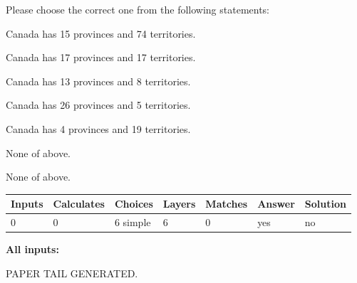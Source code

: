 \documentclass[12pt]{article}
\begin{document}
  
Please choose the correct one from the following statements:
 
 
Canada has  15 provinces and  74 territories.
 
 
Canada has  17 provinces and  17 territories.
 
 
Canada has  13 provinces and  8 territories.
 
 
Canada has  26 provinces and  5 territories.
 
 
Canada has   4 provinces and  19 territories.
 
 
 None of above.
 
 
\noindent{}
 
 
 None of above.
 
 
\noindent{}
 
 
   
   
   
   
\noindent\begin{tabular}{|l|l|l|l|l|l|l|}
 \hline
Inputs & Calculates & Choices & Layers & Matches & Answer & Solution \\ \hline
 0  & 
 0  & 
 6
  simple  
  & 
 6  & 
 0  & 
  yes & 
  no 
  \\ \hline
 \end{tabular}
   
   
   
   
\noindent{}
   
   
   
   
\noindent\vspace{0.1in}\hspace{-0.08in} {\textbf{\Large{All inputs: }}}
   
   
   
   
   
   
 \vspace{0.2in}
 
   
   
\vspace{2.0in} PAPER TAIL GENERATED.
   
   
   
\end{document}
